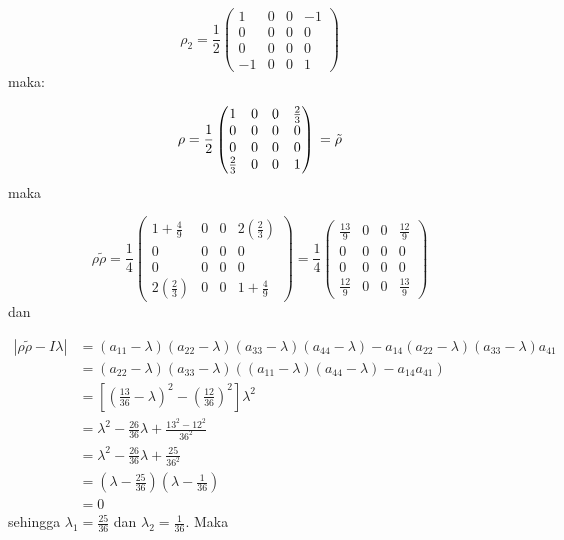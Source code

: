 \begin{equation}
	\rho_2 = \frac{1}{2}
	\begin{pmatrix}
		1&0&0&-1\\
		0&0&0&0\\
		0&0&0&0\\
		-1&0&0&1
	\end{pmatrix}
\end{equation}
maka:  

\begin{equation}
	\rho =\frac{1}{2}
	\begin{pmatrix}
		1&0&0&\frac{2}{3}\\
		0&0&0&0\\
		0&0&0&0\\
		\frac{2}{3}&0&0&1
	\end{pmatrix}\\
	=\tilde{\rho}
\end{equation}
maka

\begin{equation}
	\rho \tilde{\rho}=\frac{1}{4}
	\begin{pmatrix}
		1+\frac{4}{9}&0&0&2(\frac{2}{3})\\
		0&0&0&0\\
		0&0&0&0\\
		2(\frac{2}{3})&0&0&1+\frac{4}{9}
	\end{pmatrix}
	=\frac{1}{4}
	\begin{pmatrix}
		\frac{13}{9}&0&0&\frac{12}{9}\\
		0&0&0&0\\
		0&0&0&0\\
		\frac{12}{9}&0&0&\frac{13}{9}
	\end{pmatrix}
\end{equation}
dan

\begin{equation}
	\begin{aligned}
		|\rho \tilde{\rho}-I\lambda|
		&=(a_{11}-\lambda)(a_{22}-\lambda)(a_{33}-\lambda)(a_{44}-\lambda)-a_{14}(a_{22}-\lambda)(a_{33}-\lambda)a_{41}\\
		&=(a_{22}-\lambda)(a_{33}-\lambda)((a_{11}-\lambda)(a_{44}-\lambda)-a_{14}a_{41})\\
		&=[(\frac{13}{36}-\lambda)^2-(\frac{12}{36})^2]\lambda^2\\
		&=\lambda^2-\frac{26}{36}\lambda+\frac{13^2-12^2}{36^2}\\
		&=\lambda^2-\frac{26}{36}\lambda+\frac{25}{36^2}\\
		&=(\lambda-\frac{25}{36})(\lambda-\frac{1}{36})\\
		&=0
	\end{aligned}
\end{equation}
sehingga $\lambda_1=\frac{25}{36}$ dan $\lambda_2=\frac{1}{36}$. Maka

